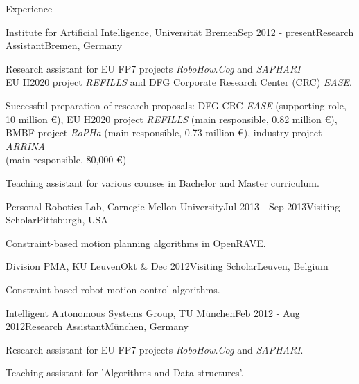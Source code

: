 \documentclass{resume} %
\begin{document}
\begin{rSection}{Experience}
	
\begin{rSubsection}{Institute for Artificial Intelligence, Universit\"at Bremen}{Sep 2012 - present}{Research Assistant}{Bremen, Germany}
  \item Research assistant for EU FP7 projects \textit{RoboHow.Cog} and \textit{SAPHARI}\\
        EU H2020 project \textit{REFILLS} and DFG Corporate Research Center (CRC) \textit{EASE}.
  \item Successful preparation of research proposals: DFG CRC \textit{EASE} (supporting role,\\ 10 million \euro), EU H2020 project \textit{REFILLS} (main responsible, 0.82 million \euro),\\ BMBF project \textit{RoPHa} (main responsible, 0.73 million \euro), industry project \textit{ARRINA}\\ (main responsible, 80,000 \euro)
  \item Teaching assistant for various courses in Bachelor and Master curriculum.
\end{rSubsection}


\begin{rSubsection}{Personal Robotics Lab, Carnegie Mellon University}{Jul 2013 - Sep 2013}{Visiting Scholar}{Pittsburgh, USA}
  \item Constraint-based motion planning algorithms in OpenRAVE.
\end{rSubsection}


\begin{rSubsection}{Division PMA, KU Leuven}{Okt \& Dec 2012}{Visiting Scholar}{Leuven, Belgium}
  \item Constraint-based robot motion control algorithms.
\end{rSubsection}


\begin{rSubsection}{Intelligent Autonomous Systems Group, TU M\"unchen}{Feb 2012 - Aug 2012}{Research Assistant}{M\"unchen, Germany}
  \item Research assistant for EU FP7 projects \textit{RoboHow.Cog} and \textit{SAPHARI}.
  \item Teaching assistant for 'Algorithms and Data-structures'.
\end{rSubsection}


\end{rSection}
\end{document}
